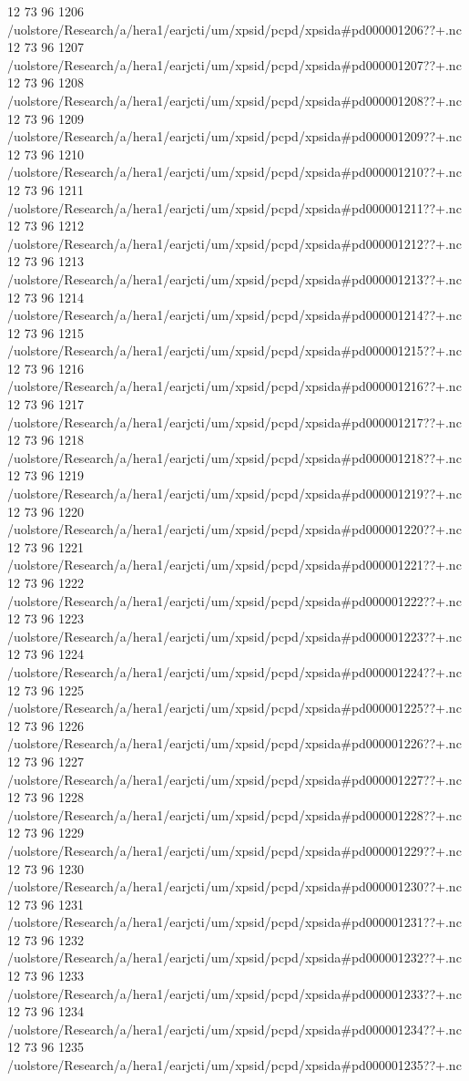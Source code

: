 12 73 96
1206
/uolstore/Research/a/hera1/earjcti/um/xpsid/pcpd/xpsida#pd000001206??+.nc
12 73 96
1207
/uolstore/Research/a/hera1/earjcti/um/xpsid/pcpd/xpsida#pd000001207??+.nc
12 73 96
1208
/uolstore/Research/a/hera1/earjcti/um/xpsid/pcpd/xpsida#pd000001208??+.nc
12 73 96
1209
/uolstore/Research/a/hera1/earjcti/um/xpsid/pcpd/xpsida#pd000001209??+.nc
12 73 96
1210
/uolstore/Research/a/hera1/earjcti/um/xpsid/pcpd/xpsida#pd000001210??+.nc
12 73 96
1211
/uolstore/Research/a/hera1/earjcti/um/xpsid/pcpd/xpsida#pd000001211??+.nc
12 73 96
1212
/uolstore/Research/a/hera1/earjcti/um/xpsid/pcpd/xpsida#pd000001212??+.nc
12 73 96
1213
/uolstore/Research/a/hera1/earjcti/um/xpsid/pcpd/xpsida#pd000001213??+.nc
12 73 96
1214
/uolstore/Research/a/hera1/earjcti/um/xpsid/pcpd/xpsida#pd000001214??+.nc
12 73 96
1215
/uolstore/Research/a/hera1/earjcti/um/xpsid/pcpd/xpsida#pd000001215??+.nc
12 73 96
1216
/uolstore/Research/a/hera1/earjcti/um/xpsid/pcpd/xpsida#pd000001216??+.nc
12 73 96
1217
/uolstore/Research/a/hera1/earjcti/um/xpsid/pcpd/xpsida#pd000001217??+.nc
12 73 96
1218
/uolstore/Research/a/hera1/earjcti/um/xpsid/pcpd/xpsida#pd000001218??+.nc
12 73 96
1219
/uolstore/Research/a/hera1/earjcti/um/xpsid/pcpd/xpsida#pd000001219??+.nc
12 73 96
1220
/uolstore/Research/a/hera1/earjcti/um/xpsid/pcpd/xpsida#pd000001220??+.nc
12 73 96
1221
/uolstore/Research/a/hera1/earjcti/um/xpsid/pcpd/xpsida#pd000001221??+.nc
12 73 96
1222
/uolstore/Research/a/hera1/earjcti/um/xpsid/pcpd/xpsida#pd000001222??+.nc
12 73 96
1223
/uolstore/Research/a/hera1/earjcti/um/xpsid/pcpd/xpsida#pd000001223??+.nc
12 73 96
1224
/uolstore/Research/a/hera1/earjcti/um/xpsid/pcpd/xpsida#pd000001224??+.nc
12 73 96
1225
/uolstore/Research/a/hera1/earjcti/um/xpsid/pcpd/xpsida#pd000001225??+.nc
12 73 96
1226
/uolstore/Research/a/hera1/earjcti/um/xpsid/pcpd/xpsida#pd000001226??+.nc
12 73 96
1227
/uolstore/Research/a/hera1/earjcti/um/xpsid/pcpd/xpsida#pd000001227??+.nc
12 73 96
1228
/uolstore/Research/a/hera1/earjcti/um/xpsid/pcpd/xpsida#pd000001228??+.nc
12 73 96
1229
/uolstore/Research/a/hera1/earjcti/um/xpsid/pcpd/xpsida#pd000001229??+.nc
12 73 96
1230
/uolstore/Research/a/hera1/earjcti/um/xpsid/pcpd/xpsida#pd000001230??+.nc
12 73 96
1231
/uolstore/Research/a/hera1/earjcti/um/xpsid/pcpd/xpsida#pd000001231??+.nc
12 73 96
1232
/uolstore/Research/a/hera1/earjcti/um/xpsid/pcpd/xpsida#pd000001232??+.nc
12 73 96
1233
/uolstore/Research/a/hera1/earjcti/um/xpsid/pcpd/xpsida#pd000001233??+.nc
12 73 96
1234
/uolstore/Research/a/hera1/earjcti/um/xpsid/pcpd/xpsida#pd000001234??+.nc
12 73 96
1235
/uolstore/Research/a/hera1/earjcti/um/xpsid/pcpd/xpsida#pd000001235??+.nc
